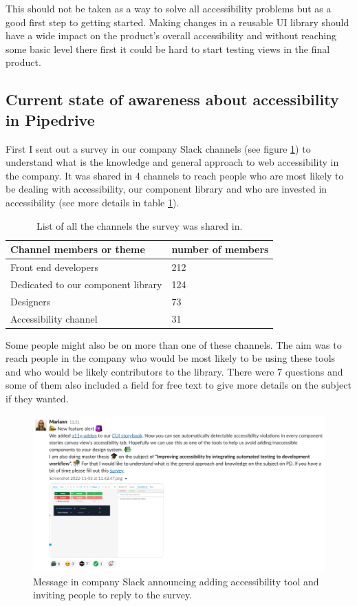 \documentclass{master_thesis}
\begin{document}
This should not be taken as a way to solve all accessibility problems but as a good first step to getting started. Making changes in a reusable UI library should have a wide impact on the product's overall accessibility and without reaching some basic level there first it could be hard to start testing views in the final product.

\subsection{Current state of awareness about accessibility in Pipedrive}

First I sent out a survey in our company Slack channels (see figure \ref{fig:slack-message}) to understand what is the knowledge and general approach to web accessibility in the company. It was shared in 4 channels to reach people who are most likely to be dealing with accessibility, our component library and who are invested in accessibility (see more details in table \ref{table:survey-shared}).

\begin{table}[h]
	\centering
	\begin{tabular}{|l|l|}
		\hline
		\textbf{Channel members or theme} & \textbf{number of members}  \\
		\hline
		Front end developers  & 212  \\
		\hline
		Dedicated to our component library  & 124  \\
		\hline
		Designers  & 73  \\
		\hline
		Accessibility channel  & 31  \\
		\hline
	\end{tabular}
	\caption{List of all the channels the survey was shared in.}
	\label{table:survey-shared}
\end{table}

Some people might also be on more than one of these channels. The aim was to reach people in the company who would be most likely to be using these tools and who would be likely contributors to the library. There were 7 questions and some of them also included a field for free text to give more details on the subject if they wanted.

\begin{figure}[h]
	\includegraphics[width=\textwidth]{img/survey.png}
	\caption{Message in company Slack announcing adding accessibility tool and inviting people to reply to the survey.}
	\label{fig:slack-message}
\end{figure}
\end{document}
